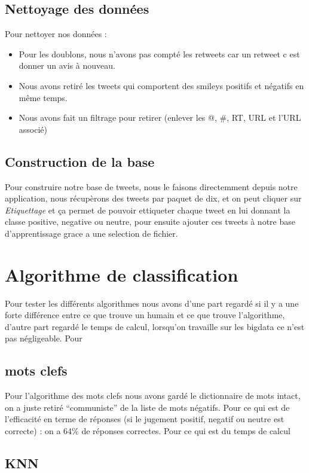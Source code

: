 \documentclass[a4paper,10pt]{report}
\begin{document}
    \subsection{Nettoyage des données}
      Pour nettoyer nos données :
      \begin{itemize}
       \item Pour les doublons, nous n'avons pas compté les retweets car un retweet c est donner un avis à nouveau.
       \item Nous avons retiré les tweets qui comportent des smileys positifs et négatifs en même temps.
       \item Nous avons fait un filtrage pour retirer  (enlever les @,  \#,  RT,  URL  et  l’URL  associé)
      \end{itemize}

    \subsection{Construction de la base}
      Pour construire notre base de tweets, nous le faisons directemment depuis notre application, nous récupèrons des tweets par 
      paquet de dix, et on peut cliquer sur \emph{Etiquettage} et ça permet de pouvoir ettiqueter chaque tweet en lui donnant la classe positive, negative ou neutre,
      pour ensuite ajouter ces tweets à notre base d'apprentissage grace a une selection de fichier.
  \section{Algorithme de classification}
    Pour tester les différents algorithmes nous avons d'une part regardé si il y a une forte différence entre ce que trouve un humain et ce que trouve l'algorithme, d'autre part
    regardé le temps de calcul, lorsqu'on travaille sur les bigdata ce n'est pas négligeable.
    Pour 
    \subsection{mots clefs}
      Pour l'algorithme des mots clefs nous avons gardé le dictionnaire de mots intact, on a juste retiré ``communiste'' de la liste de mots négatifs.
      Pour ce qui est de l'efficacité en terme de réponses (si le jugement positif, negatif ou neutre est correcte) : on a 64\% de réponses correctes.
      Pour ce qui est du temps de calcul %
      
      
    \subsection{KNN}
      
\end{document}

